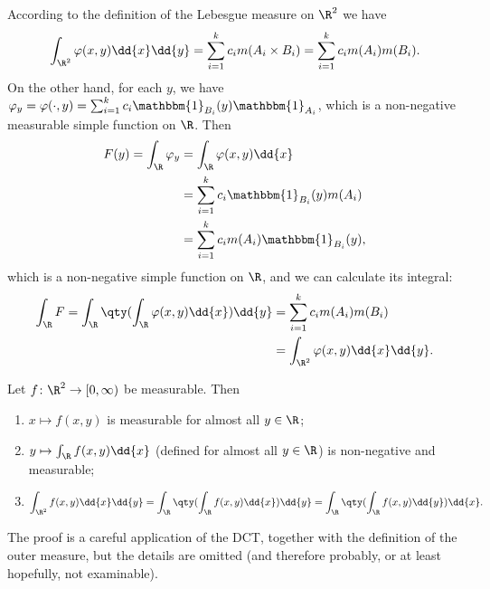 \documentclass{maths}
\newcommand{\ind}{\mathbbm{1}}
\begin{document}
\begin{prf}
    According to the definition of the Lebesgue measure on $\R^2$ we have
    \[
        \int_{\R^2} \varphi(x,y) \dd{x} \dd{y} =
        \sum_{i=1}^k c_i m(A_i\times B_i) =
        \sum_{i=1}^k c_i m(A_i)m(B_i).
    \]
    On the other hand, for each $y$, we have $\varphi_y=\varphi(\cdot,y)=\sum_{i=1}^k c_i\ind_{B_i}(y)\ind_{A_i}$, which is a non-negative measurable simple function on $\R$.
    Then
    \begin{align*}
        F(y) =
        \int_\R \varphi_y
        &= \int_\R \varphi(x,y) \dd{x}\\
        &= \sum_{i=1}^k c_i \ind_{B_i}(y) m(A_i)\\
        &= \sum_{i=1}^k c_i m(A_i) \ind_{B_i}(y),
    \end{align*}
    which is a non-negative simple function on $\R$, and we can calculate its integral:
    \begin{align*}
        \int_\R F =
        \int_\R \qty(\int_\R \varphi(x,y) \dd{x}) \dd{y}
        &= \sum_{i=1}^k c_i m(A_i) m(B_i)\\
        &= \int_{\R^2} \varphi(x,y) \dd{x} \dd{y}.
    \end{align*}
\end{prf}

\begin{prop}
    Let $f\colon\R^2\to[0,\infty)$ be measurable.
    Then
    \begin{enumerate}
        \item $x\mapsto f(x,y)$ is measurable for almost all $y\in\R$;
        \item $y\mapsto \int_\R f(x,y) \dd{x}$ (defined for almost all $y\in\R$) is non-negative and measurable;
        \item \[
            \int_{\R^2} f(x,y) \dd{x} \dd{y} =
            \int_\R \qty(\int_\R f(x,y) \dd{x}) \dd{y} =
            \int_\R \qty(\int_\R f(x,y) \dd{y}) \dd{x}.
        \]
    \end{enumerate}
\end{prop}

\begin{prf}
    The proof is a careful application of the DCT, together with the definition of the outer measure, but the details are omitted (and therefore probably, or at least hopefully, not examinable).
\end{prf}
\end{document}

